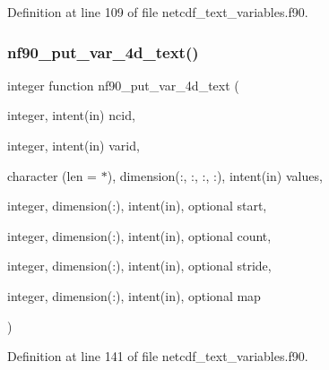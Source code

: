 Definition at line 109 of file netcdf\+\_\+text\+\_\+variables.\+f90.

\mbox{\label{netcdf__text__variables_8f90_a61fb43bb62849e0fa471b9c6dbe45f4f}} 
\subsubsection{\texorpdfstring{nf90\+\_\+put\+\_\+var\+\_\+4d\+\_\+text()}{nf90\_put\_var\_4d\_text()}}
{\footnotesize\ttfamily integer function nf90\+\_\+put\+\_\+var\+\_\+4d\+\_\+text (\begin{DoxyParamCaption}\item[{integer, intent(in)}]{ncid,  }\item[{integer, intent(in)}]{varid,  }\item[{character (len = $\ast$), dimension(\+:, \+:, \+:, \+:), intent(in)}]{values,  }\item[{integer, dimension(\+:), intent(in), optional}]{start,  }\item[{integer, dimension(\+:), intent(in), optional}]{count,  }\item[{integer, dimension(\+:), intent(in), optional}]{stride,  }\item[{integer, dimension(\+:), intent(in), optional}]{map }\end{DoxyParamCaption})}



Definition at line 141 of file netcdf\+\_\+text\+\_\+variables.\+f90.

\mbox{\label{netcdf__text__variables_8f90_a229342530494b303bb44f2f5f8fb85c8}} 

